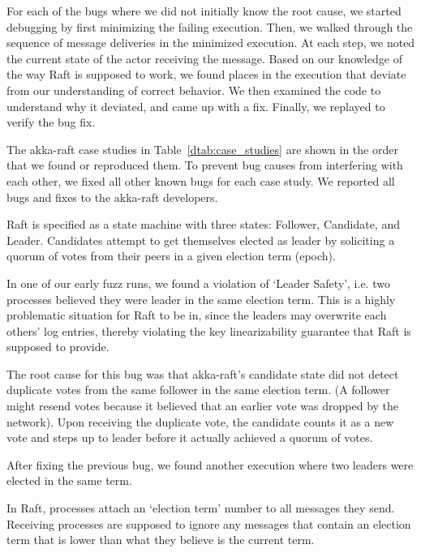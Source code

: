 For each of the bugs where we did not initially know the root cause, we
started debugging by first minimizing the failing execution. Then,
we walked through the sequence of message deliveries in the
minimized execution. At each step,
we noted the current state of the actor receiving the message. Based on
our knowledge of the way Raft is supposed to work, we found places in
the execution that deviate from our understanding of correct behavior.
We then examined the code to understand why it deviated, and came up
with a fix. Finally, we replayed to verify the bug fix.

The akka-raft case studies in Table~\ref{dtab:case_studies} are shown in the
order that we found or reproduced them. To prevent bug causes from interfering
with
each other, we fixed all other known bugs for each case study. We reported all bugs and fixes to the akka-raft
developers.

 Raft is specified as a state machine with three
 states: Follower, Candidate, and Leader. Candidates attempt to
 get themselves elected as leader by soliciting a quorum of
 votes from their peers in a given election term (epoch).

In one of our early fuzz runs, we found a violation of `Leader Safety',
 i.e. two processes believed they were leader in the same election term.
 This is a highly problematic situation for Raft to be in, since the leaders may overwrite each
 others' log entries, thereby violating the key linearizability guarantee that
 Raft is supposed to provide.

The root cause for this bug was that akka-raft's candidate
 state did not detect duplicate votes from the same follower
 in the same election term. (A follower might resend votes because it
 believed that an earlier vote was dropped by the network).
 Upon receiving the duplicate vote, the candidate counts it as a new vote and steps
 up to leader before it actually achieved a quorum of votes.

 After fixing the previous bug, we found another
 execution where two leaders were elected in the same term.

In Raft, processes attach an `election term' number to all messages they send.
 Receiving processes are supposed to ignore any messages that contain an election
 term that is lower than what they believe is the current term.

